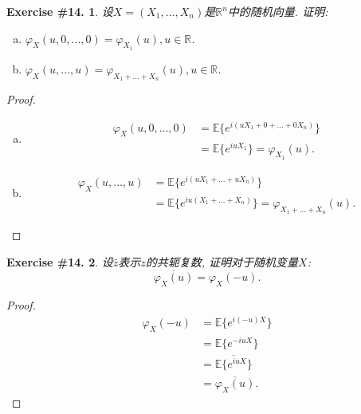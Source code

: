 \documentclass[UTF8, a4paper]{article}
\newtheorem{exercise}{Exercise \#14.}
\begin{document}
\begin{framed}
\begin{exercise}
设\(X = (X_1, ..., X_n)\)是\(\mathbb{R}^n\)中的随机向量.
证明:
\begin{enumerate}[a)]
    \item \(\varphi_X(u, 0, ..., 0) = \varphi_{X_1}(u), u\in \mathbb{R}\).
    \item \(\varphi_X(u, ..., u) = \varphi_{X_1 + ... + X_n}(u), u \in \mathbb{R}\).
\end{enumerate}
\end{exercise}
\end{framed}

\begin{proof}
\begin{enumerate}[a)]
    \item 
    $$\begin{aligned}
        \varphi_X(u, 0, ..., 0) &= \mathbb{E}\{e^{i(uX_1 + 0 + ... + 0X_n)}\} \\
        &= \mathbb{E}\{e^{iuX_1}\} = \varphi_{X_1}(u).
    \end{aligned}$$
    \item 
    $$\begin{aligned}
        \varphi_X(u, ..., u) &= \mathbb{E}\{e^{i(uX_1 + ... + uX_n)}\} \\
        &= \mathbb{E}\{e^{iu(X_1 + ... + X_n)}\} = \varphi_{X_1 + ... + X_n}(u).
    \end{aligned}$$
\end{enumerate}
\end{proof}



\begin{framed}
\begin{exercise}
设\(\bar{z}\)表示\(z\)的共轭复数, 证明对于随机变量\(X\): 
$$
\overline{\varphi_X(u)}=\varphi_X(-u) .
$$
\end{exercise}
\end{framed}

\begin{proof}
$$
\begin{aligned}
    \varphi_X(-u) &= \mathbb{E}\{e^{i(-u)X}\} \\
    &= \mathbb{E}\{e^{-iuX}\} \\
    &= \overline{\mathbb{E}\{e^{iuX}\}} \\
    &= \overline{\varphi_X(u)}.
\end{aligned}
$$
\end{proof}
\end{document}
